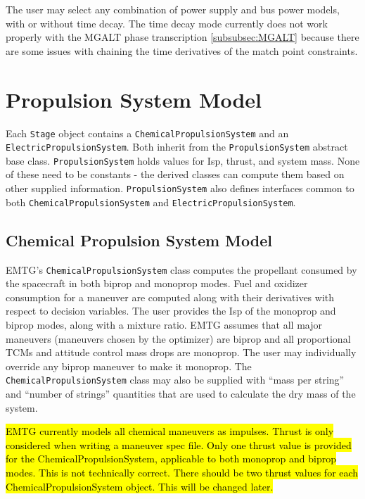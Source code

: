 The user may select any combination of power supply and bus power models, with or without time decay. The time decay mode currently does not work properly with the \ac{MGALT} phase transcription \ref{subsubsec:MGALT} because there are some issues with chaining the time derivatives of the match point constraints.

\section{Propulsion System Model}
\label{sec:PropulsionSystem}

Each \texttt{Stage} object contains a \texttt{ChemicalPropulsionSystem} and an \texttt{ElectricPropulsionSystem}. Both inherit from the \texttt{PropulsionSystem} abstract base class. \texttt{PropulsionSystem} holds values for \ac{Isp}, thrust, and system mass. None of these need to be constants - the derived classes can compute them based on other supplied information. \texttt{PropulsionSystem} also defines interfaces common to both \texttt{ChemicalPropulsionSystem} and \texttt{ElectricPropulsionSystem}.

\subsection{Chemical Propulsion System Model}
\label{subsec:ChemicalPropulsionSystem}

\ac{EMTG}'s \texttt{ChemicalPropulsionSystem} class computes the propellant consumed by the spacecraft in both biprop and monoprop modes. Fuel and oxidizer consumption for a maneuver are computed along with their derivatives with respect to decision variables. The user provides the \ac{Isp} of the monoprop and biprop modes, along with a mixture ratio. \ac{EMTG} assumes that all major maneuvers (maneuvers chosen by the optimizer) are biprop and all proportional TCMs and attitude control mass drops are monoprop. The user may individually override any biprop maneuver to make it monoprop. The \texttt{ChemicalPropulsionSystem} class may also be supplied with ``mass per string'' and ``number of strings'' quantities that are used to calculate the dry mass of the system.

\hl{EMTG currently models all chemical maneuvers as impulses. Thrust is only considered when writing a maneuver spec file. Only one thrust value is provided for the ChemicalPropulsionSystem, applicable to both monoprop and biprop modes. This is not technically correct. There should be two thrust values for each ChemicalPropulsionSystem object. This will be changed later.}

